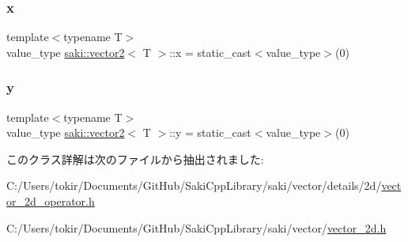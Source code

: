 \subsubsection{\texorpdfstring{x}{x}}
{\footnotesize\ttfamily template$<$typename T$>$ \\
value\+\_\+type \mbox{\hyperlink{classsaki_1_1vector2}{saki\+::vector2}}$<$ T $>$\+::x = static\+\_\+cast$<$value\+\_\+type$>$(0)}

\mbox{\label{classsaki_1_1vector2_a6275c229b3652cc2c4d88850507c5aea}} 
\subsubsection{\texorpdfstring{y}{y}}
{\footnotesize\ttfamily template$<$typename T$>$ \\
value\+\_\+type \mbox{\hyperlink{classsaki_1_1vector2}{saki\+::vector2}}$<$ T $>$\+::y = static\+\_\+cast$<$value\+\_\+type$>$(0)}



このクラス詳解は次のファイルから抽出されました\+:\begin{DoxyCompactItemize}
\item 
C\+:/\+Users/tokir/\+Documents/\+Git\+Hub/\+Saki\+Cpp\+Library/saki/vector/details/2d/\mbox{\hyperlink{vector__2d__operator_8h}{vector\+\_\+2d\+\_\+operator.\+h}}\item 
C\+:/\+Users/tokir/\+Documents/\+Git\+Hub/\+Saki\+Cpp\+Library/saki/vector/\mbox{\hyperlink{vector__2d_8h}{vector\+\_\+2d.\+h}}\end{DoxyCompactItemize}
